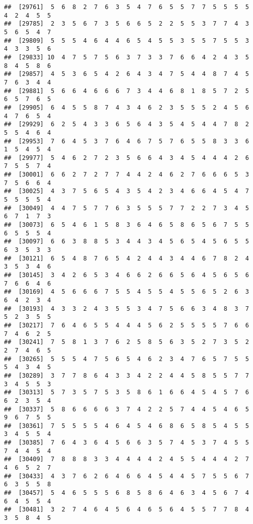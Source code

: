 \documentclass[
]{book}
\begin{document}
\begin{verbatim}
##  [29761]  5  6  8  2  7  6  3  5  4  7  6  5  5  7  7  5  5  5  5  4  2  4  5  5
##  [29785]  2  3  5  6  7  3  5  6  6  5  2  2  5  5  3  7  7  4  3  5  6  5  4  7
##  [29809]  5  5  5  4  6  4  4  6  5  4  5  5  3  5  5  7  5  5  3  4  3  3  5  6
##  [29833] 10  4  7  5  7  5  6  3  7  3  3  7  6  6  4  2  4  3  5  8  4  5  8  6
##  [29857]  4  5  3  6  5  4  2  6  4  3  4  7  5  4  4  8  7  4  5  7  6  3  4  4
##  [29881]  5  6  6  4  6  6  6  7  3  4  4  6  8  1  8  5  7  2  5  6  5  7  6  5
##  [29905]  6  4  5  5  8  7  4  3  4  6  2  3  5  5  5  2  4  5  6  4  7  6  5  4
##  [29929]  6  2  5  4  3  3  6  5  6  4  3  5  4  5  4  4  7  8  2  5  5  4  6  4
##  [29953]  7  6  4  5  3  7  6  4  6  7  5  7  6  5  5  8  3  3  6  1  5  4  5  4
##  [29977]  5  4  6  2  7  2  3  5  6  6  4  3  4  5  4  4  4  2  6  7  5  5  7  4
##  [30001]  6  6  2  7  2  7  7  4  4  2  4  6  2  7  6  6  6  5  3  7  5  6  6  4
##  [30025]  4  3  7  5  6  5  4  3  5  4  2  3  4  6  6  4  5  4  7  5  5  5  5  4
##  [30049]  4  4  7  5  7  7  6  3  5  5  5  7  7  2  2  7  3  4  5  6  7  1  7  3
##  [30073]  6  5  4  6  1  5  8  3  6  4  6  5  8  6  5  6  7  5  5  6  5  5  5  4
##  [30097]  6  6  3  8  8  5  3  4  4  3  4  5  6  5  4  5  6  5  5  6  3  5  3  3
##  [30121]  6  5  4  8  7  6  5  4  2  4  4  3  4  4  6  7  8  2  4  3  5  3  4  6
##  [30145]  3  4  2  6  5  3  4  6  6  2  6  6  5  6  4  5  6  5  6  7  6  6  4  6
##  [30169]  4  5  6  6  6  7  5  5  4  5  5  4  5  5  6  5  2  6  3  6  4  2  3  4
##  [30193]  4  3  3  2  4  3  5  5  3  4  7  5  6  6  3  4  8  3  7  5  2  3  5  5
##  [30217]  7  6  4  6  5  5  4  4  4  5  6  2  5  5  5  5  7  6  6  7  4  6  2  5
##  [30241]  7  5  8  1  3  7  6  2  5  8  5  6  3  5  2  7  3  5  2  2  7  4  6  5
##  [30265]  5  5  5  4  7  5  6  5  4  6  2  3  4  7  6  5  7  5  5  5  4  3  4  5
##  [30289]  3  7  7  8  6  4  3  3  4  2  2  4  4  5  8  5  5  7  7  3  4  5  5  3
##  [30313]  5  7  3  5  7  5  3  5  8  6  1  6  6  4  5  4  5  7  6  6  2  3  5  4
##  [30337]  5  8  6  6  6  6  3  7  4  2  2  5  7  4  4  5  4  6  5  9  6  7  5  5
##  [30361]  7  5  5  5  5  4  6  4  5  4  6  8  6  5  8  5  4  5  5  3  4  5  5  4
##  [30385]  7  6  4  3  6  4  5  6  6  3  5  7  4  5  3  7  4  5  5  7  4  4  5  4
##  [30409]  7  8  8  8  3  3  4  4  4  4  2  4  5  5  4  4  4  2  7  4  6  5  2  7
##  [30433]  4  3  7  6  2  6  4  6  6  4  5  4  4  5  7  5  5  6  7  6  3  5  5  8
##  [30457]  5  4  6  5  5  5  6  8  5  8  6  4  6  3  4  5  6  7  4  6  4  5  5  4
##  [30481]  3  2  7  4  6  4  5  6  4  6  5  6  4  5  5  7  7  8  4  3  5  8  4  5

\end{verbatim}
\end{document}
